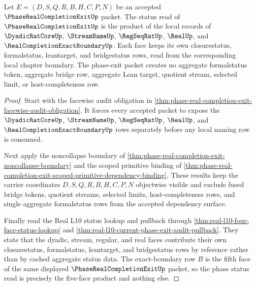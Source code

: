 \begin{theorem}
\label{thm:phase-real-completion-exit-status-token-product}
Let $E=(D,S,Q,R,B,H,C,P,N)$ be an accepted $\PhaseRealCompletionExitUp$ packet. The status read of $\PhaseRealCompletionExitUp$ is the product of the local records of $\DyadicRatCoreUp$, $\StreamNameUp$, $\RegSeqRatUp$, $\RealUp$, and $\RealCompletionExactBoundaryUp$. Each face keeps its own closurestatus, formalstatus, leantarget, and bridgestatus rows, read from the corresponding local chapter boundary. The phase-exit packet creates no aggregate formalstatus token, aggregate bridge row, aggregate Lean target, quotient stream, selected limit, or host-completeness row.
\end{theorem}
\begin{proof}
Start with the facewise audit obligation in \autoref{thm:phase-real-completion-exit-facewise-audit-obligation}. It forces every accepted packet to expose the $\DyadicRatCoreUp$, $\StreamNameUp$, $\RegSeqRatUp$, $\RealUp$, and $\RealCompletionExactBoundaryUp$ rows separately before any local naming row is consumed.

Next apply the noncollapse boundary of \autoref{thm:phase-real-completion-exit-noncollapse-boundary} and the scoped primitive binding of \autoref{thm:phase-real-completion-exit-scoped-primitive-dependency-binding}. These results keep the carrier coordinates $D,S,Q,R,B,H,C,P,N$ objectwise visible and exclude fused bridge tokens, quotient streams, selected limits, host-completeness rows, and single aggregate formalstatus rows from the accepted dependency surface.

Finally read the Real L10 status lookup and pullback through \autoref{thm:real-l10-four-face-status-lookup} and \autoref{thm:real-l10-current-phase-exit-audit-pullback}. They state that the dyadic, stream, regular, and real faces contribute their own closurestatus, formalstatus, leantarget, and bridgestatus rows by reference rather than by cached aggregate status data. The exact-boundary row $B$ is the fifth face of the same displayed $\PhaseRealCompletionExitUp$ packet, so the phase status read is precisely the five-face product and nothing else.
\end{proof}

